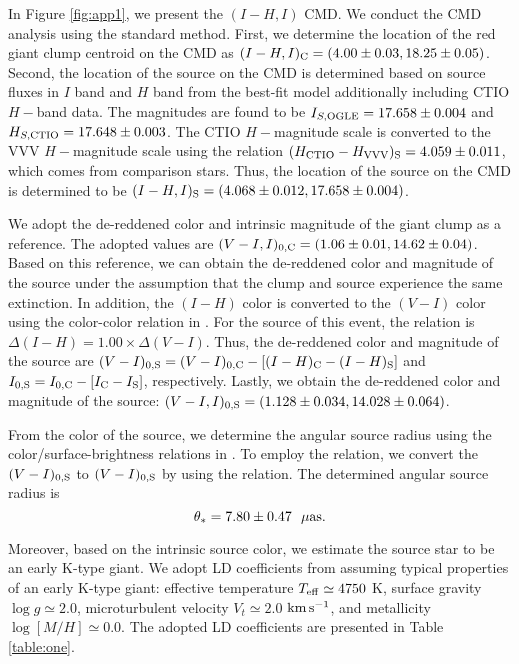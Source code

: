 \documentclass[10pt]{emulateapj}
\begin{document}
 In Figure \ref{fig:app1}, we present the $(I-H, I)$ CMD. We conduct the CMD 
analysis using the standard method. First, we determine the location of the red giant clump centroid 
on the CMD as $(I-H, I)_{\rm C} = (4.00\pm0.03, 18.25\pm0.05)$. Second, the location of the 
source on the CMD is determined based on source fluxes in $I$ band and $H$ band from the best-fit 
model additionally including CTIO $H-$band data. The magnitudes are found to be 
$I_{S,{\rm OGLE}}=17.658\pm0.004$ and $H_{S,{\rm CTIO}}=17.648\pm0.003$. The CTIO $H-$magnitude 
scale is converted to the VVV $H-$magnitude scale using the relation 
$(H_{\rm CTIO} - H_{\rm VVV})_{\rm S} = 4.059\pm0.011$, which comes from comparison stars. 
Thus, the location of the source on the CMD is determined to be 
$(I-H, I)_{\rm S} = (4.068\pm0.012,17.658\pm0.004)$.

 We adopt the de-reddened color \citep{bensby13} and intrinsic magnitude \citep{nataf13} of 
the giant clump as a reference. The adopted values are 
$(V-I, I)_{0,{\rm C}}=(1.06\pm0.01, 14.62\pm0.04)$. Based on this reference, we can obtain the 
de-reddened color and magnitude of the source under the assumption that the clump and source 
experience the same extinction. In addition, the $(I-H)$ color is converted to the $(V-I)$ 
color using the color-color relation in \citet{bessell88}. For the source of this event, the 
relation is $\Delta (I-H) = 1.00\times \Delta (V-I)$. Thus, the de-reddened color and magnitude 
of the source are $(V-I)_{0,{\rm S}} = (V-I)_{0,{\rm C}} - [(I-H)_{\rm C}-(I-H)_{\rm S}]$ 
and $I_{0,{\rm S}}=I_{0,{\rm C}} - [I_{\rm C} - I_{\rm S}]$, respectively. Lastly, we obtain 
the de-reddened color and magnitude of the source: $(V-I, I)_{0,{\rm S}} =(1.128\pm0.034, 14.028\pm0.064)$.

 From the color of the source, we determine the angular source radius using the color/surface-brightness 
relations in \citet{kervella04}. To employ the relation, we convert the $(V-I)_{0,{\rm S}}$ to 
$(V-I)_{0,{\rm S}}$ by using the \citet{bessell88} relation. The determined angular source radius is 
\begin{equation}
\theta_{\ast} = 7.80 \pm 0.47 ~~{\rm {\mu}as}.
\end{equation}

Moreover, based on the intrinsic source color, we estimate the source star to be an early K-type giant. 
We adopt LD coefficients from \citet{claret00} assuming typical properties of an early K-type giant: 
effective temperature $T_{\rm eff} \simeq 4750$ K, surface gravity $\log{g} \simeq 2.0$, 
microturbulent velocity $V_{t} \simeq 2.0$ ${\rm km\,s^{-1}}$, and metallicity $\log{[M/H]} \simeq 0.0$. 
The adopted LD coefficients are presented in Table \ref{table:one}.
\end{document}
